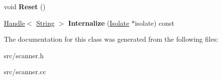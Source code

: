 \begin{DoxyCompactItemize}
\item 
\hypertarget{classv8_1_1internal_1_1_literal_buffer_a35d8f9cff691032239ecde09cac7f807}{}void {\bfseries Reset} ()\label{classv8_1_1internal_1_1_literal_buffer_a35d8f9cff691032239ecde09cac7f807}

\item 
\hypertarget{classv8_1_1internal_1_1_literal_buffer_a1e8153a6fcbd5dcd3286f4a0539cd813}{}\hyperlink{classv8_1_1internal_1_1_handle}{Handle}$<$ \hyperlink{classv8_1_1internal_1_1_string}{String} $>$ {\bfseries Internalize} (\hyperlink{classv8_1_1internal_1_1_isolate}{Isolate} $\ast$isolate) const \label{classv8_1_1internal_1_1_literal_buffer_a1e8153a6fcbd5dcd3286f4a0539cd813}

\end{DoxyCompactItemize}


The documentation for this class was generated from the following files\+:\begin{DoxyCompactItemize}
\item 
src/scanner.\+h\item 
src/scanner.\+cc\end{DoxyCompactItemize}
